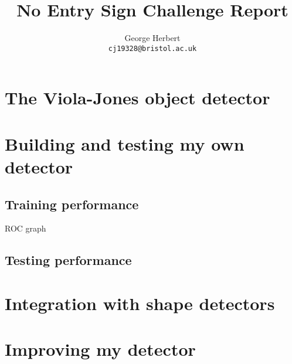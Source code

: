\documentclass[onecolumn, 12pt, a4paper]{article}
\author{
  George Herbert\\
  \texttt{cj19328@bristol.ac.uk}
}
\title{No Entry Sign Challenge Report}
\begin{document}
\maketitle


\section{The Viola-Jones object detector}

\section{Building and testing my own detector}

\subsection{Training performance}

ROC graph

\subsection{Testing performance}

\section{Integration with shape detectors}

\section{Improving my detector}



\clearpage
\begin{thebibliography}{9}
\end{thebibliography}
    
\end{document}
